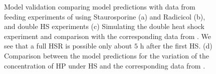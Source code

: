 \documentclass[oneside, 10pt, a4paper, twocolumn]{article}
\begin{document}
\begin{figure}
{  }%
\endminipage\hfill
\caption{\small{Model validation comparing model predictions with data from feeding experiments of \cite{Schmollinger2013} using Staurosporine (a) and Radicicol (b), and double HS experiments (c) Simulating the double heat shock experiment and comparison with the corresponding data from \cite{Schroda2000}. We see that a full HSR is possible only about $5$ h after the first HS. (d) Comparison between the model predictions for the variation of the concentration of HP under HS and the corresponding data from \cite{Muehlhaus2011}.}}
  \label{Fig3ModelValidation}
\end{figure}


\clearpage
\end{document}
